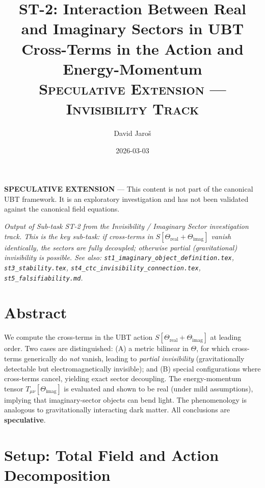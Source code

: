 \documentclass[12pt]{article}
\title{ST-2: Interaction Between Real and Imaginary Sectors in UBT\\
Cross-Terms in the Action and Energy-Momentum\\[0.5em]
\large\textsc{Speculative Extension — Invisibility Track}}
\author{David Jaroš}
\date{2026-03-03}
\begin{document}
\maketitle

\begin{tcolorbox}[colback=yellow!10, title=Status]
\textbf{SPECULATIVE EXTENSION} — This content is not part of
the canonical UBT framework.  It is an exploratory investigation
and has not been validated against the canonical field equations.
\end{tcolorbox}

\vspace{1em}
\noindent\textit{Output of Sub-task ST-2 from the Invisibility / Imaginary Sector
investigation track.  This is the \emph{key} sub-task: if cross-terms in
$S[\Theta_\mathrm{real} + \Theta_\mathrm{imag}]$ vanish identically, the
sectors are fully decoupled; otherwise partial (gravitational) invisibility
is possible.  See also:
\texttt{st1\_imaginary\_object\_definition.tex},
\texttt{st3\_stability.tex},
\texttt{st4\_ctc\_invisibility\_connection.tex},
\texttt{st5\_falsifiability.md}.}

\section*{Abstract}
We compute the cross-terms in the UBT action
$S[\Theta_\mathrm{real} + \Theta_\mathrm{imag}]$ at leading order.
Two cases are distinguished: (A) a metric bilinear in $\Theta$,
for which cross-terms generically do \emph{not} vanish, leading to
\emph{partial invisibility} (gravitationally detectable but
electromagnetically invisible); and (B) special configurations
where cross-terms cancel, yielding exact sector decoupling.
The energy-momentum tensor $T_{\mu\nu}[\Theta_\mathrm{imag}]$ is
evaluated and shown to be real (under mild assumptions), implying
that imaginary-sector objects can bend light.  The phenomenology
is analogous to gravitationally interacting dark matter.
All conclusions are \textbf{speculative}.

\section{Setup: Total Field and Action Decomposition}
\end{document}
